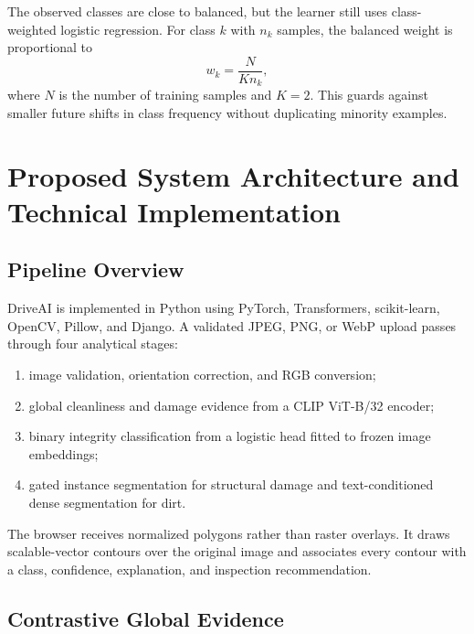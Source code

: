 \documentclass[conference]{IEEEtran}
\begin{document}
The observed classes are close to balanced, but the learner still uses class-weighted logistic regression. For class $k$ with $n_k$ samples, the balanced weight is proportional to
\begin{equation}
    w_k = \frac{N}{K n_k},
    \label{eq:classweight}
\end{equation}
where $N$ is the number of training samples and $K=2$. This guards against smaller future shifts in class frequency without duplicating minority examples.

\section{Proposed System Architecture and Technical Implementation}

\subsection{Pipeline Overview}

DriveAI is implemented in Python using PyTorch, Transformers, scikit-learn, OpenCV, Pillow, and Django. A validated JPEG, PNG, or WebP upload passes through four analytical stages:

\begin{enumerate}
    \item image validation, orientation correction, and RGB conversion;
    \item global cleanliness and damage evidence from a CLIP ViT-B/32 encoder;
    \item binary integrity classification from a logistic head fitted to frozen image embeddings;
    \item gated instance segmentation for structural damage and text-conditioned dense segmentation for dirt.
\end{enumerate}

The browser receives normalized polygons rather than raster overlays. It draws scalable-vector contours over the original image and associates every contour with a class, confidence, explanation, and inspection recommendation.

\subsection{Contrastive Global Evidence}
\end{document}
